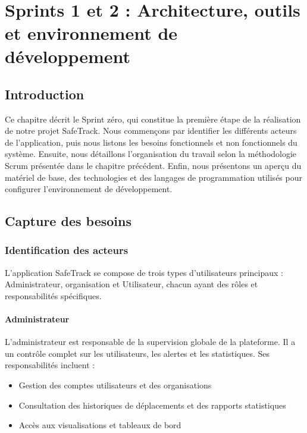 ﻿﻿\chapter{Sprints 1 et 2 : Architecture, outils et environnement de développement}
\minitoc
\newpage

\newcommand{\bluecheck}{}%
\DeclareRobustCommand{\greencheck}{%
  \tikz\fill[scale=0.4, color=green]
  (0,.35) -- (.25,0) -- (1,.7) -- (.25,.15) -- cycle;%
}



\section*{Introduction}
Ce chapitre décrit le Sprint zéro, qui constitue la première étape de la réalisation de notre projet SafeTrack. Nous commençons par identifier les différents acteurs de l'application, puis nous listons les besoins fonctionnels et non fonctionnels du système. Ensuite, nous détaillons l'organisation du travail selon la méthodologie Scrum présentée dans le chapitre précédent. Enfin, nous présentons un aperçu du matériel de base, des technologies et des langages de programmation utilisés pour configurer l'environnement de développement.


\section{Capture des besoins}

\subsection{Identification des acteurs}

L'application SafeTrack se compose de trois types d'utilisateurs principaux : Administrateur, organisation et Utilisateur, chacun ayant des rôles et responsabilités spécifiques.

\subsubsection*{Administrateur}
L'administrateur est responsable de la supervision globale de la plateforme. Il a un contrôle complet sur les utilisateurs, les alertes et les statistiques. Ses responsabilités incluent :
\begin{itemize}
    \item Gestion des comptes utilisateurs et des organisations
    \item Consultation des historiques de déplacements et des rapports statistiques
    \item Accès aux visualisations et tableaux de bord
\end{itemize}



